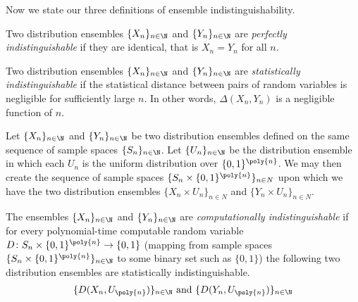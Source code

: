 Now we state our three definitions of ensemble indistinguishability.
\begin{definition}
    Two distribution ensembles $\{X_n\}_{n\in\N}$ and $\{Y_n\}_{n\in\N}$ are \emph{perfectly indistinguishable} if they are identical, that is $X_n = Y_n$ for all $n$.
\end{definition}

\begin{definition}
    Two distribution ensembles $\{X_n\}_{n\in\N}$ and $\{Y_n\}_{n\in\N}$ are \emph{statistically indistinguishable} if the statistical distance between pairs of random variables is negligible for sufficiently large $n$.
    In other words, $\Delta(X_n,Y_n)$ is a negligible function of $n$.
\end{definition}

\begin{definition}
    Let $\{X_n\}_{n\in\N}$ and $\{Y_n\}_{n\in\N}$ be two distribution ensembles defined on the same sequence of sample spaces $\{S_n\}_{n\in\N}$.
    Let $\{U_n\}_{n\in\N}$ be the distribution ensemble in which each $U_n$ is the uniform distribution over $\{0,1\}^{\poly{n}}$.
    We may then create the sequence of sample spaces $\{S_n\times\{0,1\}^{\poly{n}}\}_{n\in N}$ upon which we have the two distribution ensembles $\{X_n\times U_n\}_{n\in N}$ and $\{Y_n\times U_n\}_{n\in N}$.

    The ensembles $\{X_n\}_{n\in\N}$ and $\{Y_n\}_{n\in\N}$ are \emph{computationally indistinguishable} if for every polynomial-time computable random variable $D\colon S_n\times\{0,1\}^{\poly{n}}\to\{0,1\}$ (mapping from sample spaces $\{ S_n\times\{0,1\}^{\poly{n}} \}_{n\in\N}$ to some binary set such as $\{0,1\}$) the following two distribution ensembles are statistically indistinguishable.
    \begin{align}
        \{ D(X_n, U_{\poly{n}}) \}_{n\in\N}
        \text{ and }
        \{ D(Y_n, U_{\poly{n}}) \}_{n\in\N}
    \end{align}
\end{definition}


